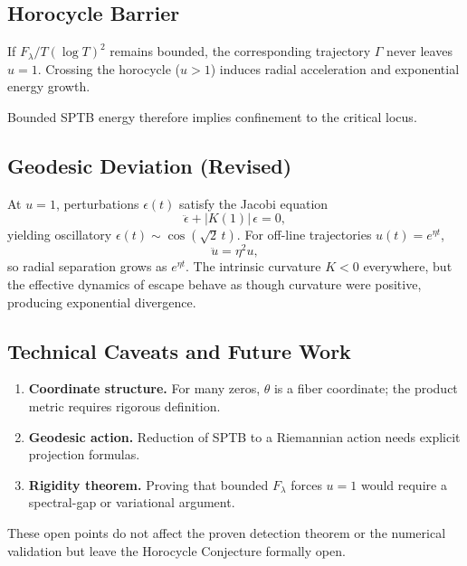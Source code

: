 \subsection{Horocycle Barrier}

\begin{conjecture}
If $F_\lambda/T(\log T)^2$ remains bounded,
the corresponding trajectory $\Gamma$ never leaves $u=1$.
Crossing the horocycle ($u>1$) induces radial acceleration and
exponential energy growth.
\end{conjecture}

Bounded SPTB energy therefore implies confinement to the critical locus.

\subsection{Geodesic Deviation (Revised)}

At $u=1$, perturbations $\epsilon(t)$ satisfy the Jacobi equation
\[
\ddot{\epsilon}+|K(1)|\,\epsilon=0,
\]
yielding oscillatory $\epsilon(t)\!\sim\!\cos(\sqrt2\,t)$.
For off-line trajectories $u(t)=e^{\eta t}$,
\[
\ddot{u}=\eta^2 u,
\]
so radial separation grows as $e^{\eta t}$.
The intrinsic curvature $K<0$ everywhere,
but the effective dynamics of escape behave as though curvature were positive,
producing exponential divergence.

\subsection{Technical Caveats and Future Work}

\begin{enumerate}
\item \textbf{Coordinate structure.}
For many zeros, $\theta$ is a fiber coordinate; the product metric requires
rigorous definition.
\item \textbf{Geodesic action.}
Reduction of SPTB to a Riemannian action needs explicit projection formulas.
\item \textbf{Rigidity theorem.}
Proving that bounded $F_\lambda$ forces $u=1$ would require a spectral-gap or
variational argument.
\end{enumerate}

These open points do not affect the proven detection theorem or the numerical
validation but leave the Horocycle Conjecture formally open.

